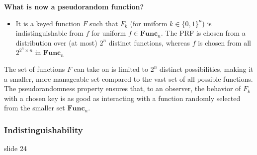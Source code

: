 \documentclass[12pt]{article}
\begin{document}
\textbf{What is now a pseudorandom function?}
\begin{itemize}
\item It is a keyed function $F$ such that $F_k$ (for uniform $k\in \{0,1\}^n$) is indistinguishable from $f$ for uniform  $f \in \textbf{Func}_n$. The PRF is chosen from a distribution over (at most) $2^n$ distinct functions, whereas $f$ is chosen from all $2^{2^n\times n}$ in $\textbf{Func}_n$
\end{itemize}
The set of functions \( F \) can take on is limited to \( 2^n \) distinct possibilities, making it a smaller, more manageable set compared to the vast set of all possible functions. The pseudorandomness property ensures that, to an observer, the behavior of \( F_k \) with a chosen key is as good as interacting with a function randomly selected from the smaller set \( \textbf{Func}_n \).
\subsubsection{Indistinguishability} slide 24
\end{document}
